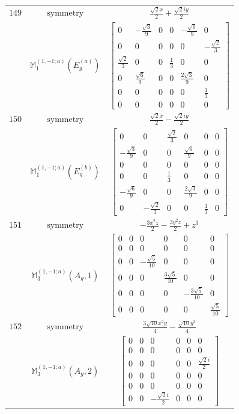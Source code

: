 \documentclass[fleqn,8pt,landscape]{jsarticle}
\begin{document}
\begin{longtable}{ccc}
$ 149 $ & $ \text{symmetry} $ & $ \frac{\sqrt{2} x}{2} + \frac{\sqrt{2} i y}{2} $ \\
$  $ & $ \mathbb{M}_{1}^{(1,-1;a)}(E_{g}^{(a)}) $ & $ \begin{bmatrix} 0 & - \frac{\sqrt{3}}{9} & 0 & 0 & - \frac{\sqrt{6}}{9} & 0 \\ 0 & 0 & 0 & 0 & 0 & - \frac{\sqrt{2}}{3} \\ \frac{\sqrt{2}}{3} & 0 & 0 & \frac{1}{3} & 0 & 0 \\ 0 & \frac{\sqrt{6}}{9} & 0 & 0 & \frac{2 \sqrt{3}}{9} & 0 \\ 0 & 0 & 0 & 0 & 0 & \frac{1}{3} \\ 0 & 0 & 0 & 0 & 0 & 0 \end{bmatrix} $ \\ \hline
$ 150 $ & $ \text{symmetry} $ & $ \frac{\sqrt{2} x}{2} - \frac{\sqrt{2} i y}{2} $ \\
$  $ & $ \mathbb{M}_{1}^{(1,-1;a)}(E_{g}^{(b)}) $ & $ \begin{bmatrix} 0 & 0 & \frac{\sqrt{2}}{3} & 0 & 0 & 0 \\ - \frac{\sqrt{3}}{9} & 0 & 0 & \frac{\sqrt{6}}{9} & 0 & 0 \\ 0 & 0 & 0 & 0 & 0 & 0 \\ 0 & 0 & \frac{1}{3} & 0 & 0 & 0 \\ - \frac{\sqrt{6}}{9} & 0 & 0 & \frac{2 \sqrt{3}}{9} & 0 & 0 \\ 0 & - \frac{\sqrt{2}}{3} & 0 & 0 & \frac{1}{3} & 0 \end{bmatrix} $ \\ \hline
$ 151 $ & $ \text{symmetry} $ & $ - \frac{3 x^{2} z}{2} - \frac{3 y^{2} z}{2} + z^{3} $ \\
$  $ & $ \mathbb{M}_{3}^{(1,-1;a)}(A_{g},1) $ & $ \begin{bmatrix} 0 & 0 & 0 & 0 & 0 & 0 \\ 0 & 0 & 0 & 0 & 0 & 0 \\ 0 & 0 & - \frac{\sqrt{5}}{10} & 0 & 0 & 0 \\ 0 & 0 & 0 & \frac{3 \sqrt{5}}{10} & 0 & 0 \\ 0 & 0 & 0 & 0 & - \frac{3 \sqrt{5}}{10} & 0 \\ 0 & 0 & 0 & 0 & 0 & \frac{\sqrt{5}}{10} \end{bmatrix} $ \\ \hline
$ 152 $ & $ \text{symmetry} $ & $ \frac{3 \sqrt{10} x^{2} y}{4} - \frac{\sqrt{10} y^{3}}{4} $ \\
$  $ & $ \mathbb{M}_{3}^{(1,-1;a)}(A_{g},2) $ & $ \begin{bmatrix} 0 & 0 & 0 & 0 & 0 & 0 \\ 0 & 0 & 0 & 0 & 0 & 0 \\ 0 & 0 & 0 & 0 & 0 & \frac{\sqrt{2} i}{2} \\ 0 & 0 & 0 & 0 & 0 & 0 \\ 0 & 0 & 0 & 0 & 0 & 0 \\ 0 & 0 & - \frac{\sqrt{2} i}{2} & 0 & 0 & 0 \end{bmatrix} $ \\ \hline

\end{longtable}
\end{document}
